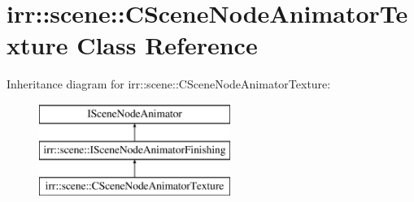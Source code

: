 \hypertarget{classirr_1_1scene_1_1_c_scene_node_animator_texture}{\section{irr\-:\-:scene\-:\-:C\-Scene\-Node\-Animator\-Texture Class Reference}
\label{classirr_1_1scene_1_1_c_scene_node_animator_texture}
}
Inheritance diagram for irr\-:\-:scene\-:\-:C\-Scene\-Node\-Animator\-Texture\-:\begin{figure}[H]
\begin{center}
\leavevmode
\includegraphics[height=3.000000cm]{classirr_1_1scene_1_1_c_scene_node_animator_texture}
\end{center}
\end{figure}
